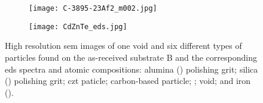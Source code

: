\begin{figure}[htbp]
\begin{subfigure}[t]{\textwidth}
        \caption{}\label{fig:SEM_B_particulates_eds}
          \begin{minipage}[t]{0.43\linewidth}
            \centering
            \texttt{[image: C-3895-23Af2\_m002.jpg]}
          \end{minipage}
          \hfill
          \begin{minipage}[t]{0.43\linewidth}
            \centering
            \texttt{[image: CdZnTe\_eds.jpg]}
          \end{minipage}
          \begin{minipage}[t]{0.11\linewidth}
            \centering
            \atomicTable[&][&][&]
          \end{minipage}
    \end{subfigure}%
    \caption[\Ac{sem} images, \ac{eds} spectra, and \ac{eds} atomic compositions of one void and six different types of particles found on as-received substrate B.]{High resolution \ac{sem} images of one void and six different types of particles found on the as-received substrate B and the corresponding \ac{eds} spectra and atomic compositions:  alumina () polishing grit;  silica () polishing grit;  \ac{czt} paticle;  carbon-based particle;  ;  void; and  iron ().}\label{fig:subBa_sem_w_eds}
\end{figure}
%
